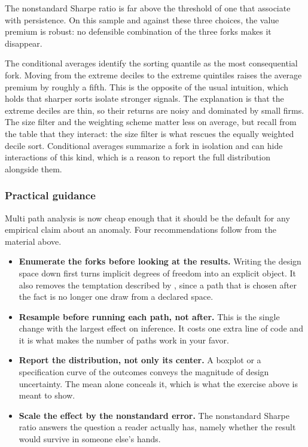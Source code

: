 The nonstandard Sharpe ratio is far above the threshold of one that \cite{coqueret2026persistent} associate with persistence. On this sample and against these three choices, the value premium is robust: no defensible combination of the three forks makes it disappear.

The conditional averages identify the sorting quantile as the most consequential fork. Moving from the extreme deciles to the extreme quintiles raises the average premium by roughly a fifth. This is the opposite of the usual intuition, which holds that sharper sorts isolate stronger signals. The explanation is that the extreme deciles are thin, so their returns are noisy and dominated by small firms. The size filter and the weighting scheme matter less on average, but recall from the table that they interact: the size filter is what rescues the equally weighted decile sort. Conditional averages summarize a fork in isolation and can hide interactions of this kind, which is a reason to report the full distribution alongside them.

\subsubsection{Practical guidance}\label{sec_design_practice}

Multi path analysis is now cheap enough that it should be the default for any empirical claim about an anomaly. Four recommendations follow from the material above.

\begin{itemize}
\item \textbf{Enumerate the forks before looking at the results.} Writing the design space down first turns implicit degrees of freedom into an explicit object. It also removes the temptation described by \cite{chen2021phacking}, since a path that is chosen after the fact is no longer one draw from a declared space.
\item \textbf{Resample before running each path, not after.} This is the single change with the largest effect on inference. It costs one extra line of code and it is what makes the number of paths work in your favor.
\item \textbf{Report the distribution, not only its center.} A boxplot or a specification curve of the outcomes conveys the magnitude of design uncertainty. The mean alone conceals it, which is what the exercise above is meant to show.
\item \textbf{Scale the effect by the nonstandard error.} The nonstandard Sharpe ratio answers the question a reader actually has, namely whether the result would survive in someone else's hands.
\end{itemize}

